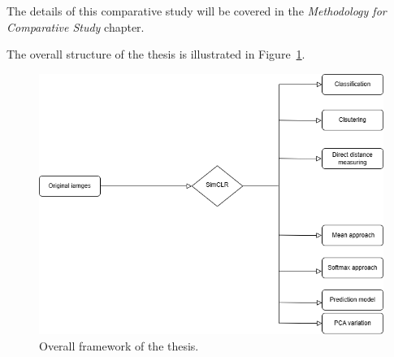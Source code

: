 The details of this comparative study will be covered in the \textit{Methodology for Comparative Study} chapter.

The overall structure of the thesis is illustrated in Figure~\ref{fig:BigOutline}.

\begin{figure}[H]
  \centering
  \includegraphics[scale=0.46]{figures/bigpic.png} 
  \caption{Overall framework of the thesis.}
  \label{fig:BigOutline}
\end{figure}
